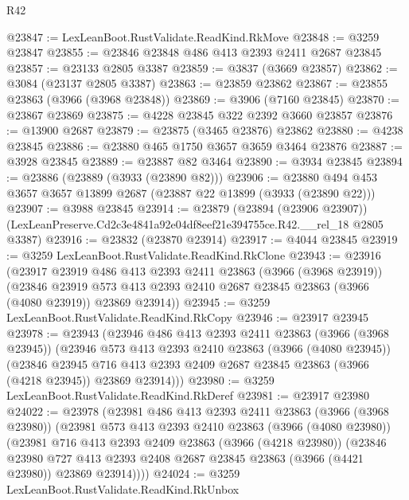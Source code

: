 \begin{lexlean}{R42}
\begin{coremodule}
@23847 := LexLeanBoot.RustValidate.ReadKind.RkMove
@23848 := @3259 @23847
@23855 := @23846 @23848 @486 @413 @2393 @2411 @2687 @23845
@23857 := @23133 @2805 @3387
@23859 := @3837 (@3669 @23857)
@23862 := @3084 (@23137 @2805 @3387)
@23863 := @23859 @23862
@23867 := @23855 @23863 (@3966 (@3968 @23848))
@23869 := @3906 (@7160 @23845)
@23870 := @23867 @23869
@23875 := @4228 @23845 @322 @2392 @3660 @23857
@23876 := @13900 @2687
@23879 := @23875 (@3465 @23876) @23862
@23880 := @4238 @23845
@23886 := @23880 @465 @1750 @3657 @3659 @3464 @23876
@23887 := @3928 @23845
@23889 := @23887 @82 @3464
@23890 := @3934 @23845
@23894 := @23886 (@23889 (@3933 (@23890 @82)))
@23906 := @23880 @494 @453 @3657 @3657 @13899 @2687 (@23887 @22 @13899 (@3933 (@23890 @22)))
@23907 := @3988 @23845
@23914 := @23879
    (@23894 (@23906 @23907))
    (LexLeanPreserve.Cd2c3e4841a92e04df8eef21e394755ce.R42.__rel_18 @2805 @3387)
@23916 := @23832 (@23870 @23914)
@23917 := @4044 @23845
@23919 := @3259 LexLeanBoot.RustValidate.ReadKind.RkClone
@23943 := @23916
    (@23917
      @23919
      @486
      @413
      @2393
      @2411
      @23863
      (@3966 (@3968 @23919))
      (@23846
        @23919
        @573
        @413
        @2393
        @2410
        @2687
        @23845
        @23863
        (@3966 (@4080 @23919))
        @23869
        @23914))
@23945 := @3259 LexLeanBoot.RustValidate.ReadKind.RkCopy
@23946 := @23917 @23945
@23978 := @23943
    (@23946
      @486
      @413
      @2393
      @2411
      @23863
      (@3966 (@3968 @23945))
      (@23946
        @573
        @413
        @2393
        @2410
        @23863
        (@3966 (@4080 @23945))
        (@23846
          @23945
          @716
          @413
          @2393
          @2409
          @2687
          @23845
          @23863
          (@3966 (@4218 @23945))
          @23869
          @23914)))
@23980 := @3259 LexLeanBoot.RustValidate.ReadKind.RkDeref
@23981 := @23917 @23980
@24022 := @23978
    (@23981
      @486
      @413
      @2393
      @2411
      @23863
      (@3966 (@3968 @23980))
      (@23981
        @573
        @413
        @2393
        @2410
        @23863
        (@3966 (@4080 @23980))
        (@23981
          @716
          @413
          @2393
          @2409
          @23863
          (@3966 (@4218 @23980))
          (@23846
            @23980
            @727
            @413
            @2393
            @2408
            @2687
            @23845
            @23863
            (@3966 (@4421 @23980))
            @23869
            @23914))))
@24024 := @3259 LexLeanBoot.RustValidate.ReadKind.RkUnbox

\end{coremodule}
\end{lexlean}
